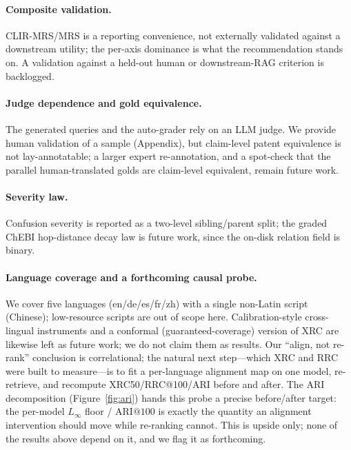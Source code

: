 \documentclass[11pt]{article}
\begin{document}
\paragraph{Composite validation.}
CLIR-MRS/MRS is a reporting convenience, not externally validated against a
downstream utility; the per-axis dominance is what the recommendation stands on.
A validation against a held-out human or downstream-RAG criterion is backlogged.

\paragraph{Judge dependence and gold equivalence.}
The generated queries and the auto-grader rely on an LLM judge. We provide human
validation of a sample (Appendix), but claim-level patent equivalence is not
lay-annotatable; a larger expert re-annotation, and a spot-check that the
parallel human-translated golds are claim-level equivalent, remain future work.

\paragraph{Severity law.}
Confusion severity is reported as a two-level sibling/parent split; the graded
ChEBI hop-distance decay law is future work, since the on-disk relation field is
binary.

\paragraph{Language coverage and a forthcoming causal probe.}
We cover five languages (en/de/es/fr/zh) with a single non-Latin script
(Chinese); low-resource scripts are out of scope here. Calibration-style
cross-lingual instruments and a conformal (guaranteed-coverage) version of XRC
are likewise left as future work; we do not claim them as results. Our
``align, not re-rank'' conclusion is correlational; the natural next step---which
XRC and RRC were built to measure---is to fit a per-language alignment map on one
model, re-retrieve, and recompute XRC50/RRC@100/ARI before and after. The ARI
decomposition (Figure~\ref{fig:ari}) hands this probe a precise before/after
target: the per-model $L_\infty$ floor / $\mathrm{ARI@}100$ is exactly the
quantity an alignment intervention should move while re-ranking cannot. This is
upside only; none of the results above depend on it, and we flag it as
forthcoming.

\end{document}
